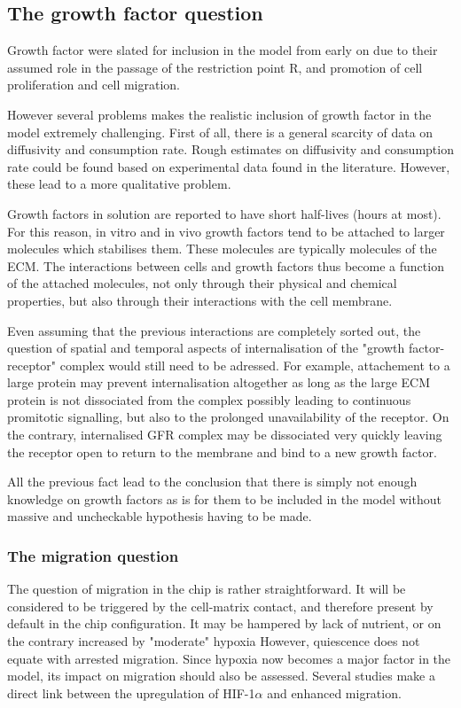 \documentclass[11pt,a4paper]{article}
\begin{document}
\subsection{The growth factor question}
Growth factor were slated for inclusion in the model from early on due to their assumed role in the passage of the restriction point R, and promotion of cell proliferation and cell migration.\cite{Nabil2021}\cite{Rajasekharan2009}\cite{Bauer2004}

However several problems makes the realistic inclusion of growth factor in the model extremely challenging. First of all, there is a general scarcity of data on diffusivity and consumption rate. Rough estimates on diffusivity and consumption rate could be found based on experimental data found in the literature. However, these lead to a more qualitative problem.

Growth factors in solution are reported to have short half-lives (hours at most).\cite{Ren2020}\cite{Teixeira2020} For this reason, in vitro and in vivo growth factors tend to be attached to larger molecules which stabilises them. These molecules are typically molecules of the ECM. The interactions between cells and growth factors thus become a function of the attached molecules, not only through their physical and chemical properties, but also through their interactions with the cell membrane.\cite{Teixeira2020}\cite{ChenJW2018} 

Even assuming that the previous interactions are completely sorted out, the question of spatial and temporal aspects of internalisation of the "growth factor-receptor" complex would still need to be adressed. For example, attachement to a large protein may prevent internalisation altogether as long as the large ECM protein is not dissociated from the complex possibly leading to continuous promitotic signalling, but also to the  prolonged unavailability of the receptor. On the contrary, internalised GFR complex may be dissociated very quickly leaving the receptor open to return to the membrane and bind to a new growth factor.\cite{Ren2020}\cite{Teixeira2020}

All the previous fact lead to the conclusion that there is simply not enough knowledge on growth factors as is for them to be included in the model without massive and uncheckable hypothesis having to be made.

\subsubsection{The migration question}
The question of migration in the chip is rather straightforward. It will be considered to be triggered by the cell-matrix contact, and therefore present by default in the chip configuration. It may be hampered by lack of nutrient, or on the contrary increased by "moderate" hypoxia However, quiescence does not equate with arrested migration. Since hypoxia now becomes a major factor in the model, its impact on migration should also be assessed. Several studies make a direct link between the upregulation of HIF-1$\alpha$ and enhanced migration.\cite{Joseph2015}\cite{Velasquez2019}\cite{Eckerich2007} 
\end{document}

